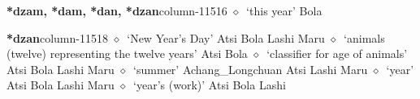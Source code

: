   \item {\footnotesize \textbf{*dzam, *dam, *dan, *dzan}}{\tiny column-11516}
         $\diamond$~`this year'
         Bola 
  \item {\footnotesize \textbf{*dzan}}{\tiny column-11518}
         $\diamond$~`New Year's Day'
         Atsi 
\hspace{1ex}
         Bola 
\hspace{1ex}
         Lashi 
\hspace{1ex}
         Maru 
\hspace{1ex}
         $\diamond$~`animals (twelve) representing the twelve years'
         Atsi 
\hspace{1ex}
         Bola 
\hspace{1ex}
         $\diamond$~`classifier for age of animals'
         Atsi 
\hspace{1ex}
         Bola 
\hspace{1ex}
         Lashi 
\hspace{1ex}
         Maru 
\hspace{1ex}
         $\diamond$~`summer'
         Achang\_Longchuan 
\hspace{1ex}
         Atsi 
\hspace{1ex}
         Lashi 
\hspace{1ex}
         Maru 
\hspace{1ex}
         $\diamond$~`year'
         Atsi 
\hspace{1ex}
         Bola 
\hspace{1ex}
         Lashi 
\hspace{1ex}
         Maru 
\hspace{1ex}
         $\diamond$~`year's (work)'
         Atsi 
\hspace{1ex}
         Bola 
\hspace{1ex}
         Lashi 
